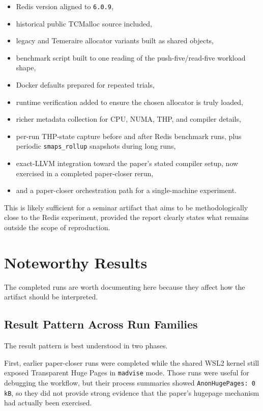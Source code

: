 \documentclass[a4paper,11pt]{article}
\begin{document}
\begin{itemize}[leftmargin=1.5em]
  \item Redis version aligned to \texttt{6.0.9},
  \item historical public TCMalloc source included,
  \item legacy and Temeraire allocator variants built as shared objects,
  \item benchmark script built to one reading of the push-five/read-five
  workload shape,
  \item Docker defaults prepared for repeated trials,
  \item runtime verification added to ensure the chosen allocator is truly loaded,
  \item richer metadata collection for CPU, NUMA, THP, and compiler details,
  \item per-run THP-state capture before and after Redis benchmark runs, plus
  periodic \texttt{smaps\_rollup} snapshots during long runs,
  \item exact-LLVM integration toward the paper's stated compiler setup, now
  exercised in a completed paper-closer rerun,
  \item and a paper-closer orchestration path for a single-machine experiment.
\end{itemize}

This is likely sufficient for a seminar artifact that aims to be methodologically close to the Redis experiment, provided the report clearly states what remains outside the scope of reproduction.

\section{Noteworthy Results}

The completed runs are worth documenting here because they affect how the
artifact should be interpreted.

\subsection{Result Pattern Across Run Families}

The result pattern is best understood in two phases.

First, earlier paper-closer runs were completed while the shared WSL2 kernel
still exposed Transparent Huge Pages in \texttt{madvise} mode. Those runs were
useful for debugging the workflow, but their process summaries showed
\texttt{AnonHugePages: 0 kB}, so they did not provide strong evidence that the
paper's hugepage mechanism had actually been exercised.
\end{document}
